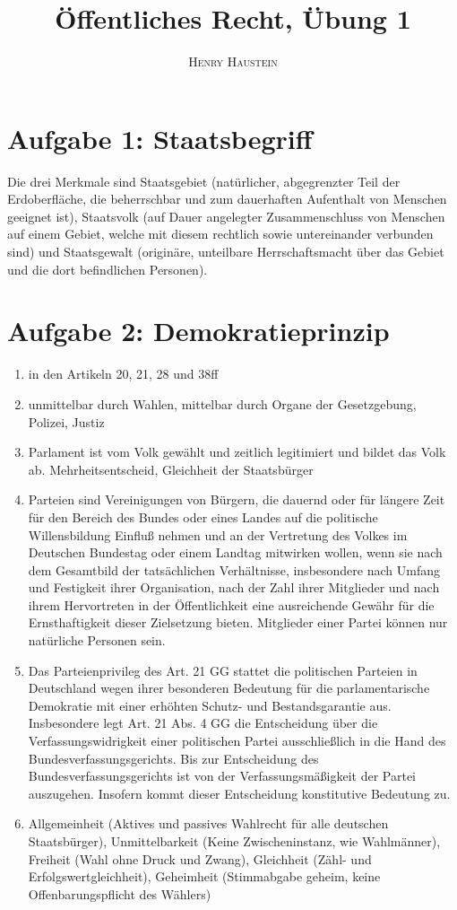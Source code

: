 \documentclass{article}
\title{\textbf{Öffentliches Recht, Übung 1}}
\author{\textsc{Henry Haustein}}
\date{}
\begin{document}
	\maketitle
	
	\section*{Aufgabe 1: Staatsbegriff}
	Die drei Merkmale sind Staatsgebiet (natürlicher, abgegrenzter Teil der Erdoberfläche, die beherrschbar und zum dauerhaften Aufenthalt von Menschen geeignet ist), Staatsvolk (auf Dauer angelegter Zusammenschluss von Menschen auf einem Gebiet, welche mit diesem rechtlich sowie untereinander verbunden sind) und Staatsgewalt (originäre, unteilbare Herrschaftsmacht über das Gebiet und die dort befindlichen Personen).

	\section{Aufgabe 2: Demokratieprinzip}
	\begin{enumerate}[label=(\alph*)]
		\item in den Artikeln 20, 21, 28 und 38ff
		\item unmittelbar durch Wahlen, mittelbar durch Organe der Gesetzgebung, Polizei, Justiz
		\item Parlament ist vom Volk gewählt und zeitlich legitimiert und bildet das Volk ab. Mehrheitsentscheid, Gleichheit der Staatsbürger
		\item Parteien sind Vereinigungen von Bürgern, die dauernd oder für längere Zeit für den Bereich des Bundes oder eines Landes auf die politische Willensbildung Einfluß nehmen und an der Vertretung des Volkes im Deutschen Bundestag oder einem Landtag mitwirken wollen, wenn sie nach dem Gesamtbild der tatsächlichen Verhältnisse, insbesondere nach Umfang und Festigkeit ihrer Organisation, nach der Zahl ihrer Mitglieder und nach ihrem Hervortreten in der Öffentlichkeit eine ausreichende Gewähr für die Ernsthaftigkeit dieser Zielsetzung bieten. Mitglieder einer Partei können nur natürliche Personen sein.
		\item Das Parteienprivileg des Art. 21 GG stattet die politischen Parteien in Deutschland wegen ihrer besonderen Bedeutung für die parlamentarische Demokratie mit einer erhöhten Schutz- und Bestandsgarantie aus. Insbesondere legt Art. 21 Abs. 4 GG die Entscheidung über die Verfassungswidrigkeit einer politischen Partei ausschließlich in die Hand des Bundesverfassungsgerichts. Bis zur Entscheidung des Bundesverfassungsgerichts ist von der Verfassungsmäßigkeit der Partei auszugehen. Insofern kommt dieser Entscheidung konstitutive Bedeutung zu.
		\item Allgemeinheit (Aktives und passives Wahlrecht für alle deutschen Staatsbürger), Unmittelbarkeit (Keine Zwischeninstanz, wie Wahlmänner), Freiheit (Wahl ohne Druck und Zwang), Gleichheit (Zähl- und Erfolgswertgleichheit), Geheimheit (Stimmabgabe geheim, keine Offenbarungspflicht des Wählers)
	\end{enumerate}
\end{document}
